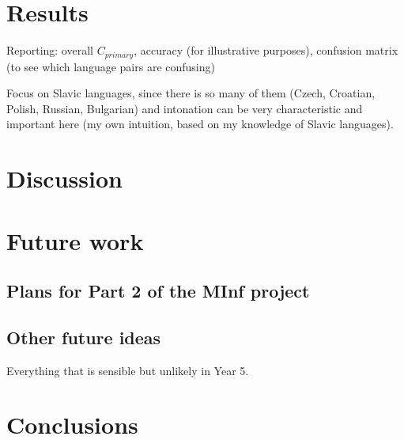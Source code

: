 \documentclass[bsc,frontabs,twoside,singlespacing,parskip,deptreport]{infthesis}
\begin{document}
\chapter{Results}{
  Reporting: overall $C_{primary}$, accuracy (for illustrative purposes), confusion matrix (to see which language pairs are confusing)
  
  Focus on Slavic languages, since there is so many of them (Czech, Croatian, Polish, Russian, Bulgarian) and intonation can be very characteristic and important here (my own intuition, based on my knowledge of Slavic languages).
}

\chapter{Discussion}{
  
}

\chapter{Future work}{
  \section{Plans for Part 2 of the MInf project}{

  }

  \section{Other future ideas}{
    Everything that is sensible but unlikely in Year 5.
  }
}

\chapter{Conclusions}{
  
}



\end{document}
